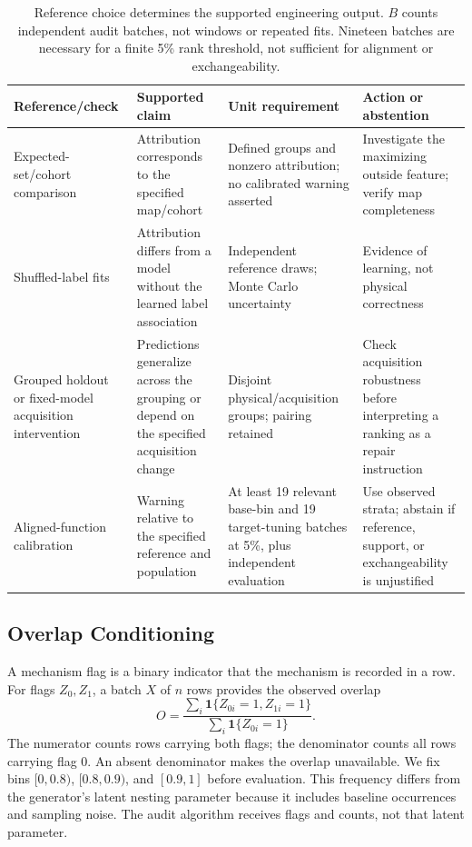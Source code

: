 \documentclass[conference]{IEEEtran}
\begin{document}
\begin{table}[t]
\centering
\caption{Reference choice determines the supported engineering output. $B$ counts independent audit batches, not windows or repeated fits. Nineteen batches are necessary for a finite 5\% rank threshold, not sufficient for alignment or exchangeability.}
\label{tab:procedure}
\footnotesize
\begin{tabular}{L{0.17\textwidth}L{0.27\textwidth}L{0.22\textwidth}L{0.24\textwidth}}
\toprule
Reference/check & Supported claim & Unit requirement & Action or abstention \\
\midrule
Expected-set/cohort comparison & Attribution corresponds to the specified map/cohort & Defined groups and nonzero attribution; no calibrated warning asserted & Investigate the maximizing outside feature; verify map completeness \\
Shuffled-label fits & Attribution differs from a model without the learned label association & Independent reference draws; Monte Carlo uncertainty & Evidence of learning, not physical correctness \\
Grouped holdout or fixed-model acquisition intervention & Predictions generalize across the grouping or depend on the specified acquisition change & Disjoint physical/acquisition groups; pairing retained & Check acquisition robustness before interpreting a ranking as a repair instruction \\
Aligned-function calibration & Warning relative to the specified reference and population & At least 19 relevant base-bin and 19 target-tuning batches at 5\%, plus independent evaluation & Use observed strata; abstain if reference, support, or exchangeability is unjustified \\
\bottomrule
\end{tabular}
\end{table}

\subsection{Overlap Conditioning}
A mechanism flag is a binary indicator that the mechanism is recorded in a row. For flags $Z_0,Z_1$, a batch $X$ of $n$ rows provides the observed overlap
\begin{equation}
 O=\frac{\sum_i\mathbf1\{Z_{0i}=1,Z_{1i}=1\}}{\sum_i\mathbf1\{Z_{0i}=1\}}.
\end{equation}
The numerator counts rows carrying both flags; the denominator counts all rows carrying flag 0. An absent denominator makes the overlap unavailable. We fix bins $[0,0.8)$, $[0.8,0.9)$, and $[0.9,1]$ before evaluation. This frequency differs from the generator's latent nesting parameter because it includes baseline occurrences and sampling noise. The audit algorithm receives flags and counts, not that latent parameter.
\end{document}
